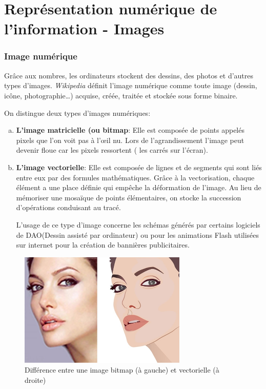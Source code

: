 \documentclass[11pt, a4paper]{book}
\begin{document}
\setcounter{chapter}{1}
\chapter{Représentation numérique de l’information - Images}

\subsection{Image numérique}

Grâce aux nombres, les ordinateurs stockent des dessins, des photos et d’autres types d’images.
{\it Wikipedia} définit l'image numérique  comme toute image (dessin, icône, photographie…) acquise, créée, traitée et stockée sous forme binaire.

On distingue deux types d’images numériques:
\begin{enumerate}[a)]
\item {\bf L'image matricielle (ou bitmap}:
Elle est composée de points appelés pixels que l’on voit pas à l'œil nu. Lors de l’agrandissement l’image peut devenir floue car les pixels ressortent ( les carrés sur l’écran).
\item {\bf L'image vectorielle}:
Elle est composée de lignes et de segments qui sont liés entre eux par des formules mathématiques. Grâce à la vectorisation, chaque élément a une place définie qui empêche la déformation de l’image. Au lieu de mémoriser une mosaïque de points élémentaires, on stocke la succession d’opérations conduisant au tracé.

L’usage de ce type d’image concerne les schémas générés par certains logiciels de DAO(Dessin assisté par ordinateur) ou pour les animations Flash utilisées sur internet pour la création de bannières publicitaires.

\end{enumerate}

\begin{center}
\begin{figure}
\centering
\includegraphics[width=8cm]{images/bitmapvectoriel}
\caption{Différence entre une image bitmap (à gauche) et vectorielle (à droite)}
\end{figure}
\end{center}
\end{document}
